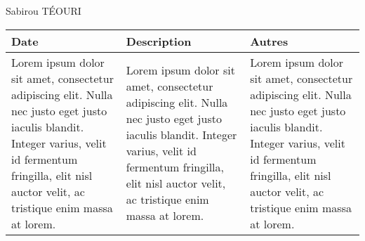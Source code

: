 \documentclass[a4paper,10pt]{article}
\begin{document}

\vspace{2cm}

\null\hfill Sabirou TÉOURI

\vfill

\begin{longtable}{|p{4cm}|p{9cm}|p{4cm}|}
\hline
\LARGE\textbf{Date} & \LARGE \textbf{Description} & \LARGE \textbf{Autres} \\
 \hline 
 \rule[-1ex]{0pt}{2.5ex} \LARGE Lorem ipsum dolor sit amet, consectetur adipiscing elit. Nulla nec justo eget justo iaculis blandit. Integer varius, velit id fermentum fringilla, elit nisl auctor velit, ac tristique enim massa at lorem. &\LARGE  Lorem ipsum dolor sit amet, consectetur adipiscing elit. Nulla nec justo eget justo iaculis blandit. Integer varius, velit id fermentum fringilla, elit nisl auctor velit, ac tristique enim massa at lorem. & \LARGE  Lorem ipsum dolor sit amet, consectetur adipiscing elit. Nulla nec justo eget justo iaculis blandit. Integer varius, velit id fermentum fringilla, elit nisl auctor velit, ac tristique enim massa at lorem. \\ 
 \hline 
\end{longtable} 
\end{document}
